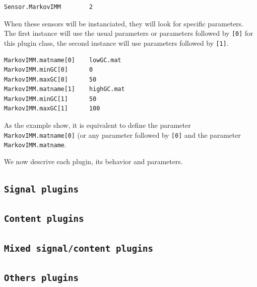 \documentclass[a4paper,titlepage]{report}
\begin{document}
\begin{Verbatim}
Sensor.MarkovIMM        2
\end{Verbatim}

When these sensors will be instanciated, they will look for specific
parameters. The first instance will use the usual parameters or parameters 
followed by \texttt{[0]} for this plugin class, the second instance will use parameters 
followed by \texttt{[1]}.

\begin{Verbatim}
MarkovIMM.matname[0]    lowGC.mat 
MarkovIMM.minGC[0]      0
MarkovIMM.maxGC[0]      50
MarkovIMM.matname[1]    highGC.mat
MarkovIMM.minGC[1]      50
MarkovIMM.maxGC[1]      100
\end{Verbatim}

As the example show, it is equivalent to define the parameter
\texttt{MarkovIMM.matname[0]} (or any parameter followed by
\texttt{[0]} and the parameter \texttt{MarkovIMM.matname}.

We now descrive each plugin, its behavior and parameters.

\subsection{\texttt{Signal plugins}}














\subsection{\texttt{Content plugins}}








\subsection{\texttt{Mixed signal/content plugins}}





\subsection{\texttt{Others plugins}}




\end{document}
